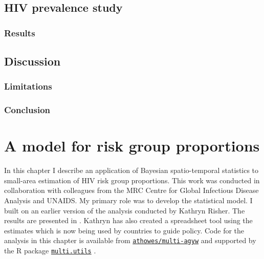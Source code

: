 \documentclass[a4paper, nobind]{templates/ociamthesis}
\begin{document}
\hypertarget{hiv-prevalence-study}{%
\section{HIV prevalence study}\label{hiv-prevalence-study}}

\hypertarget{results-1}{%
\subsection{Results}\label{results-1}}

\hypertarget{discussion}{%
\section{Discussion}\label{discussion}}

\hypertarget{limitations}{%
\subsection{Limitations}\label{limitations}}

\hypertarget{conclusion}{%
\subsection{Conclusion}\label{conclusion}}

\hypertarget{multi-agyw}{%
\chapter{A model for risk group proportions}\label{multi-agyw}}

\adjustmtc
{}

In this chapter I describe an application of Bayesian spatio-temporal statistics to small-area estimation of HIV risk group proportions.
This work was conducted in collaboration with colleagues from the MRC Centre for Global Infectious Disease Analysis and UNAIDS.
My primary role was to develop the statistical model.
I built on an earlier version of the analysis conducted by Kathryn Risher.
The results are presented in \textcite{howes2023spatio}.
Kathryn has also created a spreadsheet tool using the estimates which is now being used by countries to guide policy.
Code for the analysis in this chapter is available from \href{https://github.com/athowes/multi-agyw}{\texttt{athowes/multi-agyw}} and supported by the R package \href{https://athowes.github.io/multi.utils}{\texttt{multi.utils}} \autocite{multiutils}.
\end{document}
